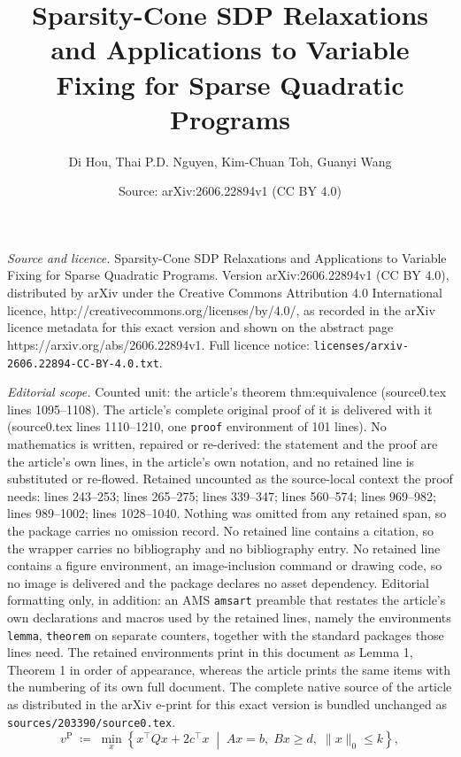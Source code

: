 \documentclass[10pt,a4paper]{amsart}
\title{Sparsity-Cone SDP Relaxations and Applications to Variable Fixing for Sparse Quadratic Programs}
\author{Di Hou, Thai P.D. Nguyen, Kim-Chuan Toh, Guanyi Wang}
\date{Source: arXiv:2606.22894v1 (CC BY 4.0)}
\begin{document}
\maketitle

\noindent\emph{Source and licence.} Sparsity-Cone SDP Relaxations and Applications to Variable Fixing for Sparse Quadratic Programs. Version arXiv:2606.22894v1 (CC BY 4.0), distributed by arXiv under the Creative Commons Attribution 4.0 International licence, http://creativecommons.org/licenses/by/4.0/, as recorded in the arXiv licence metadata for this exact version and shown on the abstract page https://arxiv.org/abs/2606.22894v1. Full licence notice: \texttt{licenses/arxiv-2606.22894-CC-BY-4.0.txt}.\par\smallskip

\noindent\textit{Editorial scope.} Counted unit: the article's theorem thm:equivalence (source0.tex lines 1095--1108). The article's complete original proof of it is delivered with it (source0.tex lines 1110--1210, one \texttt{proof} environment of 101 lines). No mathematics is written, repaired or re-derived: the statement and the proof are the article's own lines, in the article's own notation, and no retained line is substituted or re-flowed.  Retained uncounted as the source-local context the proof needs: lines 243--253; lines 265--275; lines 339--347; lines 560--574; lines 969--982; lines 989--1002; lines 1028--1040.  Nothing was omitted from any retained span, so the package carries no omission record.  No retained line contains a citation, so the wrapper carries no bibliography and no bibliography entry.  No retained line contains a figure environment, an image-inclusion command or drawing code, so no image is delivered and the package declares no asset dependency.  Editorial formatting only, in addition: an AMS \texttt{amsart} preamble that restates the article's own declarations and macros used by the retained lines, namely the environments \texttt{lemma}, \texttt{theorem} on separate counters, together with the standard packages those lines need.  The retained environments print in this document as Lemma 1, Theorem 1 in order of appearance, whereas the article prints the same items with the numbering of its own full document.  The complete native source of the article as distributed in the arXiv e-print for this exact version is bundled unchanged as \texttt{sources/203390/source0.tex}.
\begin{equation}\label{eq:QP}
v^{\mathrm{P}}
\;\coloneqq\;
\min_{x}
\left\{
 x^\top Q x + 2c^\top x
\;\middle|\;
Ax=b,\; Bx\geq d,\;
\|x\|_0\le k
\right\},\tag{P}
\end{equation}
\end{document}
